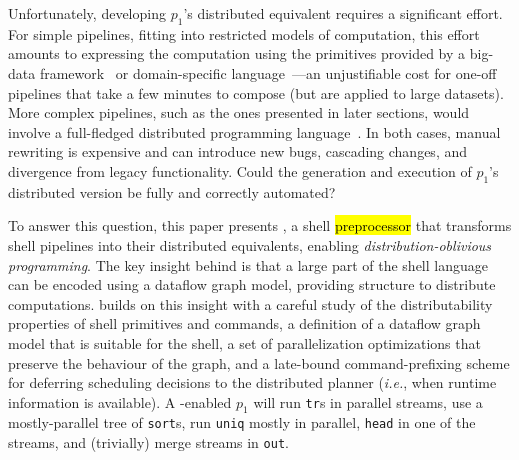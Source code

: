 \documentclass[sigplan,10pt,review,anonymous]{acmart}
\newcommand{\eg}{{\em e.g.}, }
\newcommand{\ie}{{\em i.e.}, }
\newcommand{\ttt}[1]{\texttt{\small #1}}
\newcommand{\todo}[1]{\hl{#1}\xspace}
\newcommand{\kk}[1]{[{\color{magenta}#1 --- kk}]}
\begin{document}
Unfortunately, developing $p_1$'s distributed equivalent requires a significant effort.
For simple pipelines, fitting into restricted models of computation, this effort amounts to expressing the computation using the primitives provided by a big-data framework~\cite{mapreduce:08, ciel:11, spark:12, naiad:13} or domain-specific language~\cite{alvaro2011consistency, distal:13, meiklejohn2015lasp}---an unjustifiable cost for one-off pipelines that take a few minutes to compose (but are applied to large datasets).
More complex pipelines, such as the ones presented in later sections, would involve a full-fledged distributed programming language~\cite{erlang:96, lopes1997d, acute:05, mace:07, cloudhaskell:11, ScalaLoci:18}. %
In both cases, manual rewriting is expensive and can introduce new bugs, cascading changes, and divergence from legacy functionality.
Could the generation and execution of $p_1$'s distributed version be fully and correctly automated?

To answer this question, this paper presents \sys, a shell \todo{preprocessor} that transforms shell pipelines into their distributed equivalents, enabling \emph{distribution-oblivious programming}.
The key insight behind \sys is that a large part of the shell language can be encoded using a dataflow graph model, providing structure to distribute computations.
\sys builds on this insight with a careful study of the distributability properties of shell primitives and commands, a definition of a dataflow graph model that is suitable for the shell, a set of parallelization optimizations that preserve the behaviour of the graph, and a late-bound command-prefixing scheme for deferring scheduling decisions to the distributed planner (\ie when runtime information is available).
A \sys-enabled $p_1$ will run \ttt{tr}s in parallel streams,
  use a mostly-parallel tree of \ttt{sort}s,
  run \ttt{uniq} mostly in parallel,
  \ttt{head} in one of the streams,
  and (trivially) merge streams in \ttt{out}.
\end{document}
